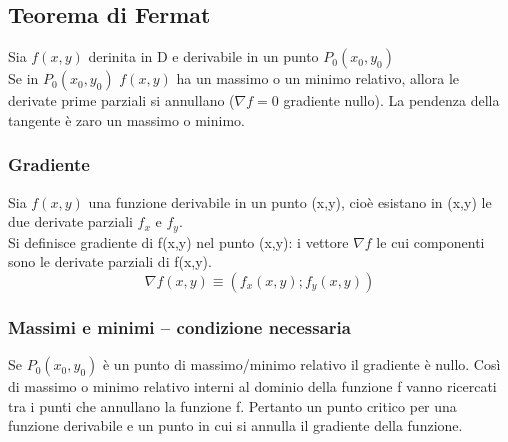 \subsection{Teorema di Fermat}
\begin{teorema}
  Sia $f(x,y)$ derinita in D e derivabile in un punto $P_0 (x_0,y_0)$\\
  Se in $P_0(x_0,y_0)$ $f(x,y)$ ha un massimo o un minimo relativo, allora le derivate prime
  parziali si annullano ($\nabla f=0$ gradiente nullo). La pendenza della tangente è zaro un
  massimo o minimo.
\end{teorema}
\subsubsection{Gradiente}
Sia $f(x,y)$ una funzione derivabile in un punto (x,y), cioè esistano in (x,y) le due derivate
parziali $f_x$ e $f_y$.\\
Si definisce {\color{red} gradiente} di f(x,y) nel punto (x,y): i vettore $\nabla f$ le cui componenti sono le derivate parziali di f(x,y).
\begin{equation}
  \nabla f(x,y) \equiv (f_x(x,y); f_y(x,y))
\end{equation}
\subsubsection{Massimi e minimi -- condizione necessaria}
\begin{defi}
  Se $P_0(x_0,y_0)$ è un punto di massimo/minimo relativo il gradiente è nullo. Così di massimo
  o minimo relativo interni al dominio della funzione f vanno ricercati tra i punti che annullano
  la funzione f. Pertanto un punto critico per una funzione derivabile e un punto in cui si
  annulla il gradiente della funzione.
\end{defi}
